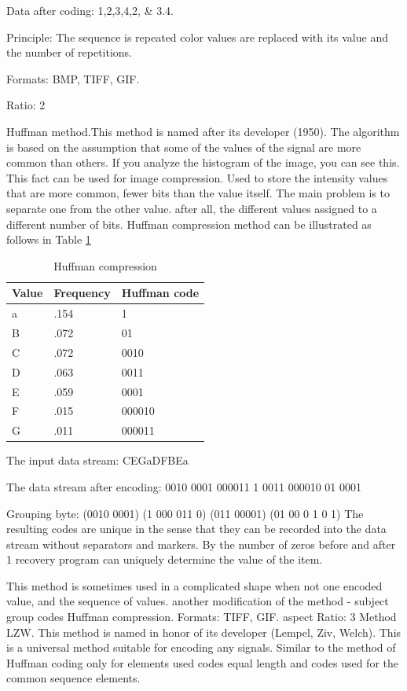Data after coding: 1,2,3,4,2, & 3.4.

Principle: The sequence is repeated color values are replaced with its value and the number of repetitions. 

Formats: BMP, TIFF, GIF. 

Ratio: 2

Huffman method.This method is named after its developer (1950). The algorithm is based on the assumption that some of the values of the signal are more common than others. If you analyze the histogram of the image, you can see this. This fact can be used for image compression. Used to store the intensity values that are more common, fewer bits than the value itself. The main problem is to separate one from the other value. after all, the different values assigned to a different number of bits. Huffman compression method can be illustrated as follows in Table \ref{tab:huffman}

\begin{longtable}[t]{|p{}|p{}|p{}|}
\caption{Huffman compression}\label{tab:huffman} \\
	\hline
	\textbf{Value} & \textbf{Frequency} & \textbf{Huffman code} \\
	\hline
	\endhead
	a
	& .154
	& 1\\ [2ex]
	\hline 
    B
    & .072
	& 01 \\ [2ex]
	\hline
    C
	& .072
	& 0010\\ [2ex]
	\hline
    D
	& .063
	& 0011\\ [2ex]
	\hline
    E
	& .059
	& 0001\\ [2ex]
	\hline
    F
	& .015
	& 000010\\ [2ex]
	\hline
    G
	& .011
	& 000011\\ [2ex]
	\hline
\end{longtable}

The input data stream: CEGaDFBEa

The data stream after encoding: 0010 0001 000011 1 0011 000010 01 0001 

Grouping byte: (0010 0001) (1 000 011 0) (011 00001) (01 00 0 1 0 1)
The resulting codes are unique in the sense that they can be recorded into the data stream without separators and markers. By the number of zeros before and after 1 recovery program can uniquely determine the value of the item.

This method is sometimes used in a complicated shape when not one encoded value, and the sequence of values. another modification of the method - subject group codes Huffman compression. Formats: TIFF, GIF. aspect Ratio: 3
Method LZW. This method is named in honor of its developer (Lempel, Ziv, Welch). This is a universal method suitable for encoding any signals. Similar to the method of Huffman coding only for elements used codes equal length and codes used for the common sequence elements.


